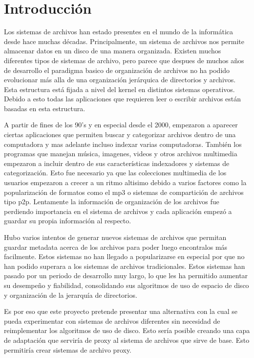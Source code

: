 \chapter{Introducción}
\label{introducción}

Los sistemas de archivos han estado presentes en el mundo de la informática desde hace muchas décadas. Principalmente, un sistema de archivos nos permite almacenar datos en un disco de una manera organizada. Existen muchos diferentes tipos de sistemas de archivo, pero parece que despues de muchos años de desarrollo el paradigma basico de organización de archivos no ha podido evolucionar más alla de una organización jerárquica de directorios y archivos. Esta estructura está fijada a nivel del kernel en distintos sistemas operativos. Debido a esto todas las aplicaciones que requieren leer o escribir archivos están basadas en esta estructura.

A partir de fines de los 90's y en especial desde el 2000, empezaron a aparecer ciertas aplicaciones que permiten buscar y categorizar archivos dentro de una computadora y mas adelante incluso indexar varias computadoras. También los programas que manejan música, imagenes, videos y otros archivos multimedia empezaron a incluir dentro de sus características indexadores y sistemas de categorización. Esto fue necesario ya que las colecciones multimedia de los usuarios empezaron a crecer a un ritmo altisimo debido a varios factores como la popularización de formatos como el mp3 o sistemas de compartición de archivos tipo p2p. Lentamente la información de organización de los archivos fue perdiendo importancia en el sistema de archivos y cada aplicación empezó a guardar su propia información al respecto.

Hubo varios intentos de generar nuevos sistemas de archivos que permitan guardar metadata acerca de los archivos para poder luego encontralos más facilmente. Estos sistemas no han llegado a popularizarse en especial por que no han podido superara a los sistemas de archivos tradicionales. Estos sistemas han pasado por un periodo de desarrollo muy largo, lo que les ha permitido aumentar su desempeño y fiabilidad, consolidando sus algoritmos de uso de espacio de disco y organización de la jerarquía de directorios.

Es por eso que este proyecto pretende presentar una alternativa con la cual se pueda experimentar con sistemas de archivos diferentes sin necesidad de reimplementar los algoritmos de uso de disco. Esto sería posible creando una capa de adaptación que serviría de proxy al sistema de archivos que sirve de base. Esto permitiría crear sistemas de archivo proxy.


